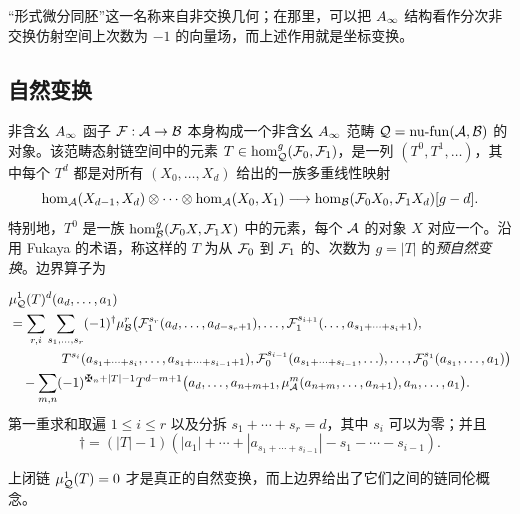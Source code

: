 \begin{note}\label{st:1.3}
“形式微分同胚”这一名称来自非交换几何；在那里，可以把 $A_\infty$ 结构看作分次非交换仿射空间上次数为 $-1$ 的向量场，而上述作用就是坐标变换。
\end{note}

\subsection{自然变换}\label{sec:1d}
\begin{definition*}
非含幺 $A_\infty$ 函子 $\mathcal F:\mathcal A\to\mathcal B$ 本身构成一个非含幺 $A_\infty$ 范畴 $\mathcal Q=\operatorname{nu\text{-}fun}(\mathcal A,\mathcal B)$ 的对象。该范畴态射链空间中的元素 $T\in\hom^g_{\mathcal Q}(\mathcal F_0,\mathcal F_1)$，是一列 $(T^0,T^1,\ldots)$，其中每个 $T^d$ 都是对所有 $(X_0,\ldots,X_d)$ 给出的一族多重线性映射
\[
\hom_{\mathcal A}(X_{d-1},X_d)\otimes\cdots\otimes\hom_{\mathcal A}(X_0,X_1)\longrightarrow\hom_{\mathcal B}(\mathcal F_0X_0,\mathcal F_1X_d)[g-d].
\]
特别地，$T^0$ 是一族 $\hom^g_{\mathcal B}(\mathcal F_0X,\mathcal F_1X)$ 中的元素，每个 $\mathcal A$ 的对象 $X$ 对应一个。沿用 Fukaya 的术语，称这样的 $T$ 为从 $\mathcal F_0$ 到 $\mathcal F_1$ 的、次数为 $g=|T|$ 的\emph{预自然变换}。边界算子为
\end{definition*}

\begin{equation}\label{eq:1.8}
\begin{aligned}
&\mu^1_{\Q}(T)^d(a_d,\ldots,a_1)\\
&=\sum_{r,i}\sum_{s_1,\ldots,s_r}(-1)^{\dagger}\mu^r_{\B}\bigl(
\F_1^{s_r}(a_d,\ldots,a_{d-s_r+1}),\ldots,\F_1^{s_{i+1}}(\ldots,a_{s_1+\cdots+s_i+1}),\\
&\hspace{4em}T^{s_i}(a_{s_1+\cdots+s_i},\ldots,a_{s_1+\cdots+s_{i-1}+1}),
\F_0^{s_{i-1}}(a_{s_1+\cdots+s_{i-1}},\ldots),\ldots,\F_0^{s_1}(a_{s_1},\ldots,a_1)\bigr)\\
&\quad-\sum_{m,n}(-1)^{\sgnmark_n+|T|-1}T^{d-m+1}\bigl(a_d,\ldots,a_{n+m+1},
\mu^m_{\A}(a_{n+m},\ldots,a_{n+1}),a_n,\ldots,a_1\bigr).
\end{aligned}
\end{equation}
第一重求和取遍 $1\le i\le r$ 以及分拆 $s_1+\cdots+s_r=d$，其中 $s_i$ 可以为零；并且
\[
\dagger=(|T|-1)(|a_1|+\cdots+|a_{s_1+\cdots+s_{i-1}}|-s_1-\cdots-s_{i-1}).
\]
\begin{definition*}
上闭链 $\mu^1_{\mathcal Q}(T)=0$ 才是真正的自然变换，而上边界给出了它们之间的链同伦概念。
\end{definition*}

